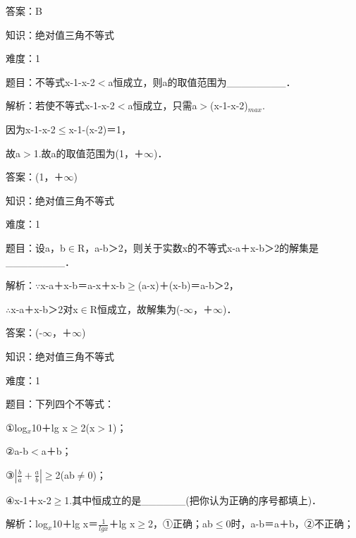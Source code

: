 \documentclass{article} %
\begin{document}
答案：B



知识：绝对值三角不等式

难度：1

题目：不等式{\textbar}x-1{\textbar}-{\textbar}x-2{\textbar}$\mathrm{<}$a恒成立，则a的取值范围为\_\_\_\_\_\_\_\_．

解析：若使不等式{\textbar}x-1{\textbar}-{\textbar}x-2{\textbar}$\mathrm{<}$a恒成立，只需a$\mathrm{>}$({\textbar}x-1{\textbar}-{\textbar}x-2{\textbar})${}_{max}$.

因为{\textbar}x-1{\textbar}-{\textbar}x-2{\textbar}$\mathrm{\le}${\textbar}x-1-(x-2){\textbar}＝1，

故a$\mathrm{>}$1.故a的取值范围为(1，＋$\mathrm{\infty}$)．

答案：(1，＋$\mathrm{\infty}$)



知识：绝对值三角不等式

难度：1

题目：设a，b$\mathrm{\in}$R，{\textbar}a-b{\textbar}＞2，则关于实数x的不等式{\textbar}x-a{\textbar}＋{\textbar}x-b{\textbar}＞2的解集是\_\_\_\_\_\_\_\_．

解析：$\mathrm{\because}${\textbar}x-a{\textbar}＋{\textbar}x-b{\textbar}＝{\textbar}a-x{\textbar}＋{\textbar}x-b{\textbar}$\mathrm{\ge}${\textbar}(a-x)＋(x-b){\textbar}＝{\textbar}a-b{\textbar}＞2，

$\mathrm{\therefore}${\textbar}x-a{\textbar}＋{\textbar}x-b{\textbar}＞2对x$\mathrm{\in}$R恒成立，故解集为(-$\mathrm{\infty}$，＋$\mathrm{\infty}$)．

答案：(-$\mathrm{\infty}$，＋$\mathrm{\infty}$)



知识：绝对值三角不等式

难度：1

题目：下列四个不等式：

①log${}_{x}$10＋lg x$\mathrm{\ge}$2(x$\mathrm{>}$1)；

②{\textbar}a-b{\textbar}$\mathrm{<}${\textbar}a{\textbar}＋{\textbar}b{\textbar}；

③$|\frac{b}{a}+\frac{a}{b}|$$\mathrm{\ge}$2(ab$\mathrm{\neq}$0)；

④{\textbar}x-1{\textbar}＋{\textbar}x-2{\textbar}$\mathrm{\ge}$1.其中恒成立的是\_\_\_\_\_\_(把你认为正确的序号都填上)．

解析：log${}_{x}$10＋lg x＝$\frac{1}{lgx}$＋lg x$\mathrm{\ge}$2，①正确；ab$\mathrm{\le}$0时，{\textbar}a-b{\textbar}＝{\textbar}a{\textbar}＋{\textbar}b{\textbar}，②不正确；
\end{document}
